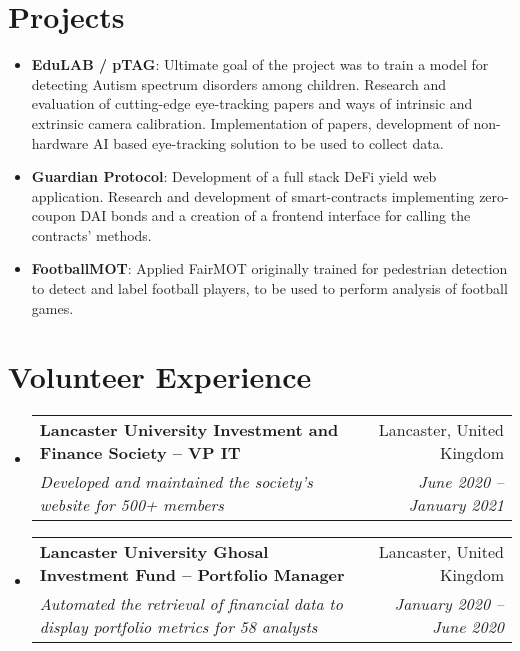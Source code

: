 \documentclass[a4paper]{article}
\makeatletter
\newcommand{\resumeItem}[2]{
  \item\small{
    \textbf{#1}{: #2 \vspace{-2pt}}
  }
}
\newcommand{\resumeSubheading}[4]{
  \vspace{-1pt}\item
    \begin{tabular*}{0.97\textwidth}{l@{\extracolsep{\fill}}r}
      \textbf{#1} & #2 \\
      \textit{#3} & \textit{#4} \\
    \end{tabular*}\vspace{-5pt}
}
\newcommand{\resumeSubItem}[2]{\resumeItem{#1}{#2}\vspace{-3pt}}
\newcommand{\resumeSubHeadingListStart}{\begin{itemize}[leftmargin=*]}
\newcommand{\resumeSubHeadingListEnd}{\end{itemize}}
\makeatother
\begin{document}
\section{Projects}
\resumeSubHeadingListStart
\resumeSubItem{EduLAB / pTAG}{Ultimate goal of the project was to train a model for detecting Autism spectrum disorders among children. Research and evaluation of cutting-edge eye-tracking papers and ways of intrinsic and extrinsic camera calibration. Implementation of papers, development of non-hardware AI based eye-tracking solution to be used to collect data.}
\vspace{2pt}
\resumeSubItem{Guardian Protocol}{Development of a full stack DeFi yield web application. Research and development of smart-contracts implementing zero-coupon DAI bonds and a creation of a frontend interface for calling the contracts’ methods.}
\resumeSubItem{FootballMOT}{Applied FairMOT originally trained for pedestrian detection to detect and label football players, to be used to perform analysis of football games.}
\resumeSubHeadingListEnd

\vspace{-5pt}
\section{Volunteer Experience}
  \resumeSubHeadingListStart
    \resumeSubheading
    {Lancaster University Investment and Finance Society – VP IT}{Lancaster, United Kingdom}
    {Developed and maintained the society's website for 500+ members}{June 2020 – January 2021}
\vspace{5pt}
    \resumeSubheading
    {Lancaster University Ghosal Investment Fund – Portfolio Manager}{Lancaster, United Kingdom}
    {Automated the retrieval of financial data to display portfolio metrics for 58 analysts}{January 2020 – June 2020}

\resumeSubHeadingListEnd
\end{document}

